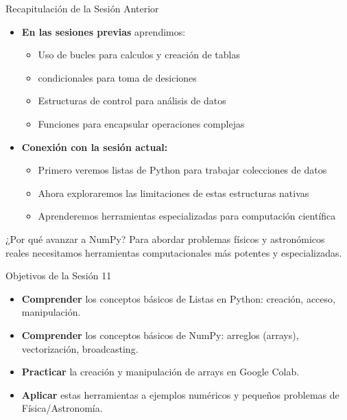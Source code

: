 \documentclass[10pt]{beamer}
\begin{document}
\begin{frame}{Recapitulación de la Sesión Anterior}
  \begin{itemize}
    \item \textbf{En las sesiones previas} aprendimos:
      \begin{itemize}
        \item Uso de bucles para calculos y creación de tablas
        \item condicionales para toma de desiciones
        \item Estructuras de control para análisis de datos
        \item Funciones para encapsular operaciones complejas
      \end{itemize}
    \item \textbf{Conexión con la sesión actual:} 
      \begin{itemize}
        \item Primero veremos listas de Python para trabajar colecciones de datos
        \item Ahora exploraremos las limitaciones de estas estructuras nativas
        \item Aprenderemos herramientas especializadas para computación científica
      \end{itemize}
  \end{itemize}
  
  \begin{alertblock}{¿Por qué avanzar a NumPy?}
    Para abordar problemas físicos y astronómicos reales necesitamos herramientas computacionales más potentes y especializadas.
  \end{alertblock}
\end{frame}


\begin{frame}{Objetivos de la Sesión 11}
  \begin{itemize}
    \item \textbf{Comprender} los conceptos básicos de Listas en Python: creación, acceso, manipulación.
    \item \textbf{Comprender} los conceptos básicos de NumPy: arreglos (arrays), vectorización, broadcasting.
    \item \textbf{Practicar} la creación y manipulación de arrays en Google Colab.
    \item \textbf{Aplicar} estas herramientas a ejemplos numéricos y pequeños problemas de Física/Astronomía.
  \end{itemize}
\end{frame}
\end{document}
